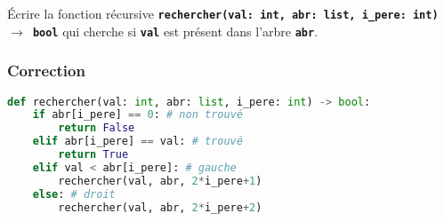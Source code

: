 \documentclass[svgnames,11pt]{beamer}
\begin{document}
\begin{frame}
\begin{activite}
Écrire la fonction récursive \textbf{\texttt{rechercher(val: int, abr: list, i\_pere: int) $\rightarrow$ bool}} qui cherche si \textbf{\texttt{val}} est présent dans l'arbre \textbf{\texttt{abr}}.
\end{activite}
    

\end{frame}
\begin{frame}[fragile]
    \frametitle{Correction}

\begin{center}
\begin{lstlisting}[language=Python , basicstyle=\ttfamily\small, xleftmargin=0.5em, xrightmargin=-3em]
def rechercher(val: int, abr: list, i_pere: int) -> bool:
    if abr[i_pere] == 0: # non trouvé
        return False
    elif abr[i_pere] == val: # trouvé
        return True
    elif val < abr[i_pere]: # gauche
        rechercher(val, abr, 2*i_pere+1)
    else: # droit
        rechercher(val, abr, 2*i_pere+2)
\end{lstlisting}
\end{center}   

\end{frame}
\end{document}

